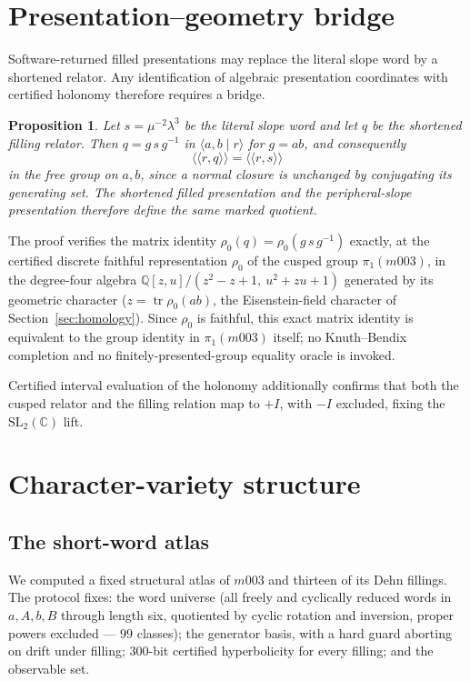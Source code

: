 \documentclass[11pt,a4paper]{article}
\newtheorem{proposition}[theorem]{Proposition}
\theoremstyle{definition}
\theoremstyle{remark}
\newcommand{\tr}{\operatorname{tr}}
\newcommand{\SLtwo}{\mathrm{SL}_2(\mathbb{C})}
\newcommand{\Q}{\mathbb{Q}}
\begin{document}
\section{Presentation--geometry bridge}
\label{sec:bridge}

Software-returned filled presentations may replace the literal slope
word by a shortened relator. Any identification of algebraic
presentation coordinates with certified holonomy therefore requires a
bridge.

\begin{proposition}
\label{prop:bridge}
Let $s = \mu^{-2}\lambda^{3}$ be the literal slope word and let $q$ be
the shortened filling relator. Then $q = g\,s\,g^{-1}$ in
$\langle a,b \mid r\rangle$ for $g = ab$, and consequently
\begin{equation}
\langle\langle r, q \rangle\rangle
= \langle\langle r, s \rangle\rangle
\end{equation}
in the free group on $a,b$, since a normal closure is unchanged by
conjugating its generating set. The shortened filled presentation and
the peripheral-slope presentation therefore define the same marked
quotient.
\end{proposition}

The proof verifies the matrix identity $\rho_0(q) = \rho_0(g\,s\,g^{-1})$
exactly, at the certified discrete faithful representation $\rho_0$ of
the cusped group $\pi_1(m003)$, in the degree-four algebra
$\Q[z,u]/(z^2-z+1,\ u^2+zu+1)$ generated by its geometric character
($z = \tr\rho_0(ab)$, the Eisenstein-field character of
Section~\ref{sec:homology}). Since $\rho_0$ is faithful, this exact
matrix identity is equivalent to the group identity in $\pi_1(m003)$
itself; no Knuth--Bendix completion and no finitely-presented-group
equality oracle is invoked.

Certified interval evaluation of the holonomy additionally confirms
that both the cusped relator and the filling relation map to $+I$,
with $-I$ excluded, fixing the $\SLtwo$ lift.

\section{Character-variety structure}
\label{sec:atlas}

\subsection{The short-word atlas}

We computed a fixed structural atlas of $m003$ and thirteen of its
Dehn fillings. The
protocol fixes: the word universe (all freely and cyclically reduced
words in $a,A,b,B$ through length six, quotiented by cyclic rotation
and inversion, proper powers excluded --- $99$ classes); the
generator basis, with a hard guard aborting on drift under filling;
$300$-bit certified hyperbolicity for every filling; and the observable
set.
\end{document}
